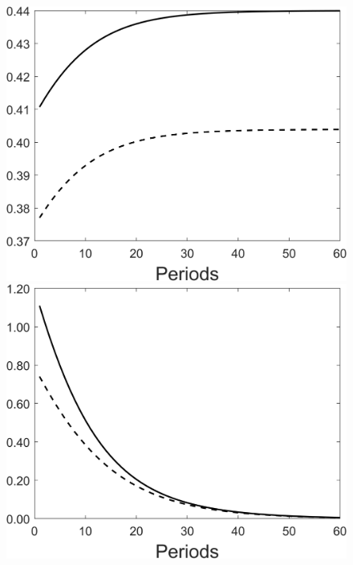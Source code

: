 \begin{figure}[h!!]
\begin{minipage}[]{0.32\textwidth}
	\end{minipage}
	\begin{minipage}[]{0.32\textwidth}
		\includegraphics[width=1\textwidth]{../codding_model/Own/figures/Rep_agent/staticRam_LF_separate_hl_periods59_eppsilon4.00_zeta1.40_Ad08_Ac04_thetac0.70_thetad0.56_HetGrowth1_tauul0.181_util0_withtarget0_lgd0.png}
	\end{minipage}
\begin{minipage}[]{0.32\textwidth}
\includegraphics[width=1\textwidth]{../codding_model/Own/figures/Rep_agent/staticRam_LF_separate_yc_periods59_eppsilon4.00_zeta1.40_Ad08_Ac04_thetac0.70_thetad0.56_HetGrowth1_tauul0.181_util0_withtarget0_lgd0.png}

\end{minipage}
\end{figure}
